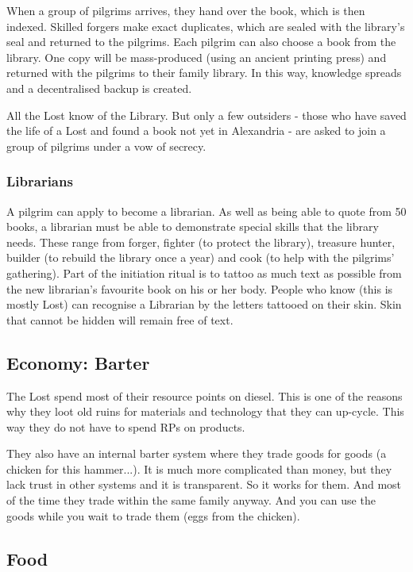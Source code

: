 When a group of pilgrims arrives, they hand over the book, which is then indexed. Skilled forgers make exact duplicates, which are sealed with the library's seal and returned to the pilgrims. Each pilgrim can also choose a book from the library. One copy will be mass-produced (using an ancient printing press) and returned with the pilgrims to their family library.
In this way, knowledge spreads and a decentralised backup is created.

All the Lost know of the Library. But only a few outsiders - those who have saved the life of a Lost and found a book not yet in Alexandria - are asked to join a group of pilgrims under a vow of secrecy.

\subsubsection{Librarians}

A pilgrim can apply to become a librarian. As well as being able to quote from 50 books, a librarian must be able to demonstrate special skills that the library needs. These range from forger, fighter (to protect the library), treasure hunter, builder (to rebuild the library once a year) and cook (to help with the pilgrims' gathering).
Part of the initiation ritual is to tattoo as much text as possible from the new librarian's favourite book on his or her body. People who know (this is mostly Lost) can recognise a Librarian by the letters tattooed on their skin.
Skin that cannot be hidden will remain free of text.

\subsection{Economy: Barter}
\label{sec:Barter}
The Lost spend most of their resource points on diesel. This is one of the reasons why they loot old ruins for materials and technology that they can up-cycle. This way they do not have to spend RPs on products.

They also have an internal barter system where they trade goods for goods (a chicken for this hammer...).
It is much more complicated than money, but they lack trust in other systems and it is transparent. So it works for them. And most of the time they trade within the same family anyway.
And you can use the goods while you wait to trade them (eggs from the chicken).

\subsection{Food}
\label{sec: lost food}

